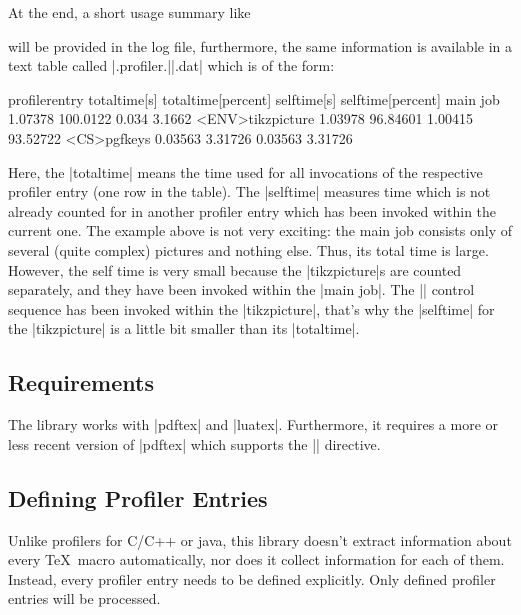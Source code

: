 At the end, a short usage summary like
\noindent will be provided in the log file, furthermore, the same information is available in a text table called |\jobname.profiler.||.dat| which is of the form:
\begin{codeexample}
profilerentry       totaltime[s]        totaltime[percent]  selftime[s]         selftime[percent]   
main job            1.07378             100.0122            0.034               3.1662              
<ENV>tikzpicture    1.03978             96.84601            1.00415             93.52722            
<CS>pgfkeys         0.03563             3.31726             0.03563             3.31726             
\end{codeexample}
Here, the |totaltime| means the time used for all invocations of the respective profiler entry (one row in the table). The |selftime| measures time which is not already counted for in another profiler entry which has been invoked within the current one. The example above is not very exciting: the main job consists only of several (quite complex) pictures and nothing else. Thus, its total time is large. However, the self time is very small because the |tikzpicture|s are counted separately, and they have been invoked within the |main job|. The |\pgfkeys| control sequence has been invoked within the |tikzpicture|, that's why the |selftime| for the |tikzpicture| is a little bit smaller than its |totaltime|.

\subsection{Requirements}
The library works with |pdftex| and |luatex|. Furthermore, it requires
a more or less recent version of |pdftex| which supports the |\pdfelapsedtime| directive.

\subsection{Defining Profiler Entries}
Unlike profilers for C/C++ or java, this library doesn't extract information about every \TeX\ macro automatically, nor does it collect information for each of them. Instead, every profiler entry needs to be defined explicitly. Only defined profiler entries will be processed.

